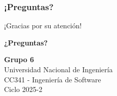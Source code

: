 \documentclass[aspectratio=169]{beamer}
\begin{document}
\begin{frame}
\frametitle{¡Preguntas?}

\begin{center}
\Large ¡Gracias por su atención! \\

\vspace{1cm}

\textbf{¿Preguntas?}

\vspace{1cm}

\normalsize
\textbf{Grupo 6}\\
Universidad Nacional de Ingeniería\\
CC341 - Ingeniería de Software\\
Ciclo 2025-2

\end{center}

\end{frame}
\end{document}
